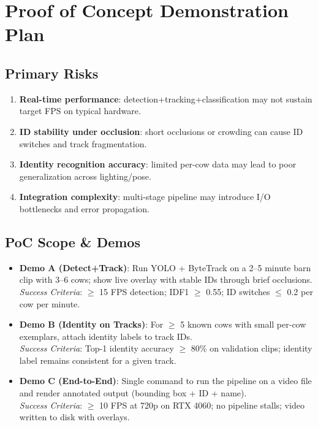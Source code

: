 \documentclass{article}
\begin{document}

\section{Proof of Concept Demonstration Plan}


\subsection*{Primary Risks}

\begin{enumerate}
  \item \textbf{Real-time performance}: detection+tracking+classification may not sustain target FPS on typical hardware.
  \item \textbf{ID stability under occlusion}: short occlusions or crowding can cause ID switches and track fragmentation.
  \item \textbf{Identity recognition accuracy}: limited per-cow data may lead to poor generalization across lighting/pose.
  \item \textbf{Integration complexity}: multi-stage pipeline may introduce I/O bottlenecks and error propagation.
\end{enumerate}

\subsection*{PoC Scope \& Demos}
\begin{itemize}
  \item \textbf{Demo A (Detect+Track)}: Run YOLO + ByteTrack on a 2--5 minute barn clip with 3--6 cows; show live overlay with stable IDs through brief occlusions. \\
  \emph{Success Criteria}: $\geq$ 15 FPS detection; IDF1 $\geq$ 0.55; ID switches $\leq$ 0.2 per cow per minute.
  \item \textbf{Demo B (Identity on Tracks)}: For $\geq$ 5 known cows with small per-cow exemplars, attach identity labels to track IDs. \\
  \emph{Success Criteria}: Top-1 identity accuracy $\geq$ 80\% on validation clips; identity label remains consistent for a given track.
  \item \textbf{Demo C (End-to-End)}: Single command to run the pipeline on a video file and render annotated output (bounding box + ID + name). \\
  \emph{Success Criteria}: $\geq$ 10 FPS at 720p on RTX 4060; no pipeline stalls; video written to disk with overlays.
\end{itemize}
\end{document}
